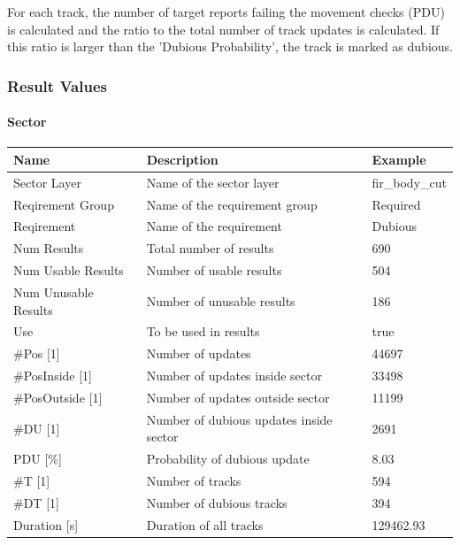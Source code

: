 For each track, the number of target reports failing the movement checks (PDU) is calculated and the ratio to the total number of track updates is calculated. If this ratio is larger than the 'Dubious Probability', the track is marked as dubious.

\subsubsection{Result Values}

\paragraph{Sector}

\begin{center}
 \begin{table}[H]
  \begin{tabularx}{\textwidth}{ | l | X |  l | }
    \hline
    \textbf{Name} & \textbf{Description} & \textbf{Example} \\ \hline
    Sector Layer & Name of the sector layer & fir\_body\_cut \\ \hline
    Reqirement Group & Name of the requirement group & Required \\ \hline
    Reqirement & Name of the requirement & Dubious \\ \hline
    Num Results & Total number of results & 690 \\ \hline
    Num Usable Results & Number of usable results & 504 \\ \hline
    Num Unusable Results & Number of unusable results & 186 \\ \hline
    Use & To be used in results & true \\ \hline
    \#Pos [1] & Number of updates & 44697 \\ \hline
    \#PosInside [1] & Number of updates inside sector & 33498 \\ \hline
    \#PosOutside [1] & Number of updates outside sector & 11199 \\ \hline
    \#DU [1] & Number of dubious updates inside sector & 2691 \\ \hline
    PDU [\%] & Probability of dubious update & 8.03 \\ \hline
    \#T [1] & Number of tracks & 594 \\ \hline
    \#DT [1] & Number of dubious tracks & 394 \\ \hline
    Duration [s] & Duration of all tracks & 129462.93 \\ \hline

\end{tabularx}
\end{table}
\end{center}
